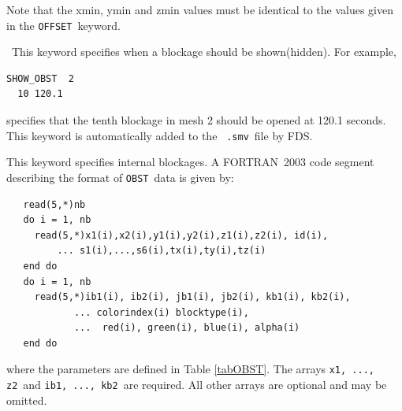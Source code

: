 \documentclass[11pt,twoside]{book}
\begin{document}
Note that the xmin, ymin and zmin values must be identical to the values given in the
{\tt OFFSET}\ keyword.


\ This keyword specifies when a
blockage should be shown(hidden). For example,
\begin{lstlisting}
SHOW_OBST  2
  10 120.1
\end{lstlisting}
specifies that the tenth blockage in mesh 2 should be opened at
120.1 seconds.  This keyword is automatically added to the {\tt
.smv}\ file by FDS.

This keyword specifies internal blockages. A
FORTRAN~2003 code segment describing the format of {\tt OBST}\ data
is given by:
\begin{lstlisting}
   read(5,*)nb
   do i = 1, nb
     read(5,*)x1(i),x2(i),y1(i),y2(i),z1(i),z2(i), id(i),
         ... s1(i),...,s6(i),tx(i),ty(i),tz(i)
   end do
   do i = 1, nb
     read(5,*)ib1(i), ib2(i), jb1(i), jb2(i), kb1(i), kb2(i),
            ... colorindex(i) blocktype(i),
            ...  red(i), green(i), blue(i), alpha(i)
   end do
\end{lstlisting}
where the parameters are defined in Table \ref{tabOBST}.
The arrays {\tt x1, ..., z2}\ and {\tt ib1, ..., kb2}\ are
required. All other arrays are optional and may be omitted.
\end{document}
